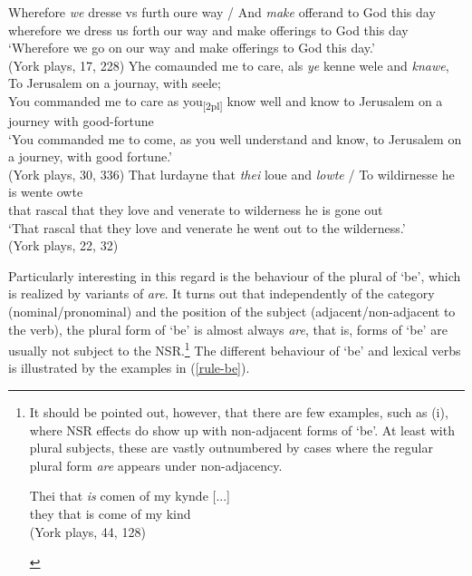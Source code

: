 \documentclass[output=paper]{langsci/langscibook}
\begin{document}
\ea
\label{york7}
\ea \gll Wherefore \textit{we} dresse vs furth oure way / And \textit{make} offerand to God this day \\
wherefore we dress us forth our way {} and make offerings to God this day\\
\glt `Wherefore we go on our way and make offerings to God this day.'\\
(York plays, 17, 228)
\ex  \gll Yhe comaunded me to care, als \textit{ye} kenne wele and \textit{knawe}, To Jerusalem on a journay, with seele; \\
You commanded me to care as you\textsubscript{[2pl]} know well and know to Jerusalem on a journey with good-fortune\\
\glt `You commanded me to come, as you well understand and know, to Jerusalem on a journey, with good fortune.' \\
(York plays, 30, 336)
\ex \gll That lurdayne that \textit{thei} loue and \textit{lowte} / To wildirnesse he is wente owte\\
that rascal that they love and venerate {} to wilderness he is gone out\\
\glt `That rascal that they love and venerate he went out to the wilderness.'\\
(York plays, 22, 32)
\z
\z

Particularly interesting in this regard is the behaviour of the plural of `be',
which is realized by variants of \emph{are}. It turns out that independently of
the category (nominal/pronominal) and the position of the subject
(adjacent\slash non-ad\-ja\-cent to the verb), the plural form of `be' is almost always
\emph{are}, that is, forms of `be' are usually not subject to the
\gls{NSR}.\footnote{It should be pointed out,
    however, that there are few examples, such as (i), where \gls{NSR} effects do show up with non-adjacent forms of `be'. At least
    with plural subjects, these are vastly outnumbered by cases where the
    regular plural form \emph{are} appears under non-adjacency.

    \begin{exe}
         \gll Thei that \textit{is} comen of my kynde [...] \\
        they that is come of my kind \\
        \glt (York plays, 44, 128)
    \end{exe}
} The different behaviour of `be' and lexical verbs is illustrated by the examples in (\ref{rule-be}).
\end{document}
